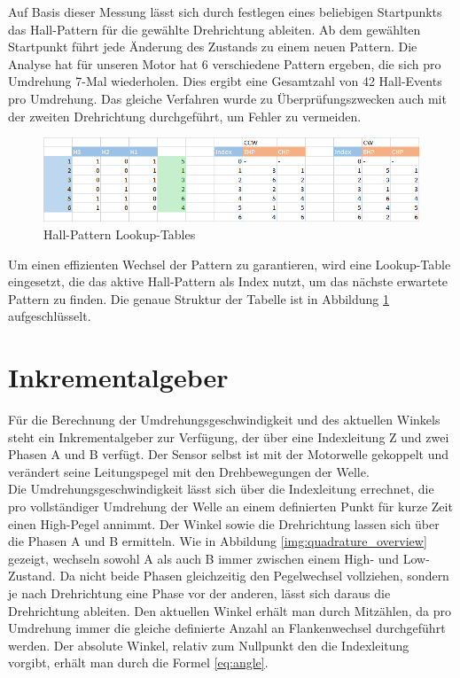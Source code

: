 Auf Basis dieser Messung lässt sich durch festlegen eines beliebigen Startpunkts das Hall-Pattern für die gewählte Drehrichtung ableiten. Ab dem gewählten Startpunkt führt jede Änderung des Zustands zu einem neuen Pattern. Die Analyse hat für unseren Motor hat 6 verschiedene Pattern ergeben, die sich pro Umdrehung 7-Mal wiederholen. Dies ergibt eine Gesamtzahl von 42 Hall-Events pro Umdrehung. Das gleiche Verfahren wurde zu Überprüfungszwecken auch mit der zweiten Drehrichtung durchgeführt, um Fehler zu vermeiden. 

\begin{figure}[ht]
\centering
\includegraphics[width=\textwidth]{sensor/hall_pattern_lookup.PNG}
\caption{Hall-Pattern Lookup-Tables}
\label{img:hall_pattern_lookup}
\end{figure}

Um einen effizienten Wechsel der Pattern zu garantieren, wird eine Lookup-Table eingesetzt, die das aktive Hall-Pattern als Index nutzt, um das nächste erwartete Pattern zu finden. Die genaue Struktur der Tabelle ist in Abbildung \ref{img:hall_pattern_lookup} aufgeschlüsselt.

\section{Inkrementalgeber}
Für die Berechnung der Umdrehungsgeschwindigkeit und des aktuellen Winkels steht ein Inkrementalgeber zur Verfügung, der über eine Indexleitung Z und zwei Phasen A und B verfügt. Der Sensor selbst ist mit der Motorwelle gekoppelt und verändert seine Leitungspegel mit den Drehbewegungen der Welle. \\

Die Umdrehungsgeschwindigkeit lässt sich über die Indexleitung errechnet, die pro vollständiger Umdrehung der Welle an einem definierten Punkt für kurze Zeit einen High-Pegel annimmt. Der Winkel sowie die Drehrichtung lassen sich über die Phasen A und B ermitteln. Wie in Abbildung \ref{img:quadrature_overview} gezeigt, wechseln sowohl A als auch B immer zwischen einem High- und Low-Zustand. Da nicht beide Phasen gleichzeitig den Pegelwechsel vollziehen, sondern je nach Drehrichtung eine Phase vor der anderen, lässt sich daraus die Drehrichtung ableiten. Den aktuellen Winkel erhält man durch Mitzählen, da pro Umdrehung immer die gleiche definierte Anzahl an Flankenwechsel durchgeführt werden. Der absolute Winkel, relativ zum Nullpunkt den die Indexleitung vorgibt, erhält man durch die Formel \ref{eq:angle}.


